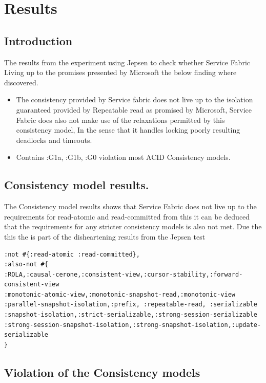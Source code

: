 \documentclass[a4paper,10pt,titlepage]{report}
\begin{document}
    \newpage
    \section{Results}

    \subsection{Introduction}
    
    The results from the experiment using Jepsen to check whether Service Fabric Living up to the promises presented by Microsoft the below finding where discovered. 
    \begin{itemize}
        \item The consistency provided by Service fabric does not live up to the isolation guaranteed provided by Repeatable read as promised by Microsoft, Service Fabric does also not make use of the relaxations permitted by this consistency model, In the sense that it handles locking poorly resulting deadlocks and timeouts.
        \item Contains :G1a, :G1b, :G0 violation most ACID Consistency models.
    \end{itemize}
    
    
    
    \subsection{Consistency model results.}
    The Consistency model results shows that Service Fabric does not live up to the requirements for read-atomic and read-committed from this it can be deduced that the requirements for any stricter consistency models is also not met. Due the this the is part of the disheartening results from the Jepsen test 
    \begin{lstlisting}
:not #{:read-atomic :read-committed},
:also-not #{
:ROLA,:causal-cerone,:consistent-view,:cursor-stability,:forward-consistent-view
:monotonic-atomic-view,:monotonic-snapshot-read,:monotonic-view
:parallel-snapshot-isolation,:prefix, :repeatable-read, :serializable
:snapshot-isolation,:strict-serializable,:strong-session-serializable
:strong-session-snapshot-isolation,:strong-snapshot-isolation,:update-serializable
}
    \end{lstlisting}

\newpage
\subsection{Violation of the Consistency models}
\end{document}
